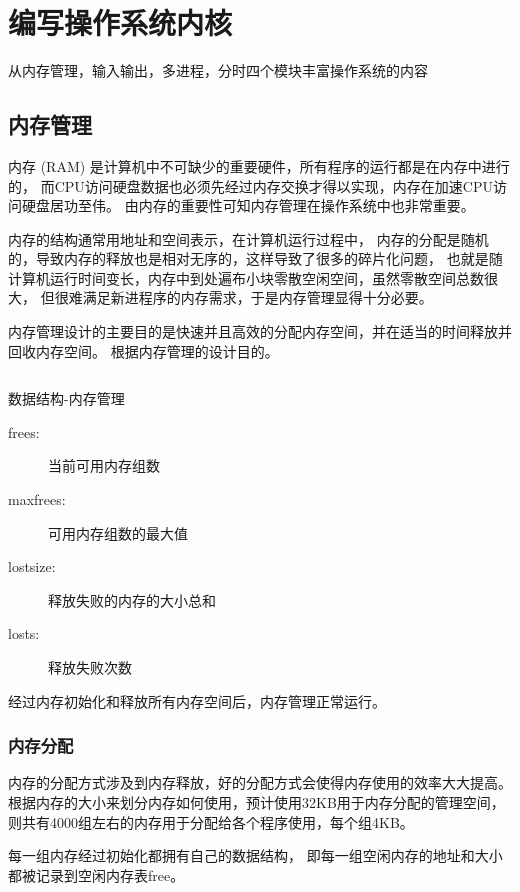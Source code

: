 \chapter{编写操作系统内核}

从内存管理，输入输出，多进程，分时四个模块丰富操作系统的内容

\section{内存管理}

内存 (RAM) 是计算机中不可缺少的重要硬件，所有程序的运行都是在内存中进行的，
而CPU访问硬盘数据也必须先经过内存交换才得以实现，内存在加速CPU访问硬盘居功至伟。
由内存的重要性可知内存管理在操作系统中也非常重要。	

内存的结构通常用地址和空间表示，在计算机运行过程中，
内存的分配是随机的，导致内存的释放也是相对无序的，这样导致了很多的碎片化问题，
也就是随计算机运行时间变长，内存中到处遍布小块零散空闲空间，虽然零散空间总数很大，
但很难满足新进程序的内存需求，于是内存管理显得十分必要。

内存管理设计的主要目的是快速并且高效的分配内存空间，并在适当的时间释放并回收内存空间。
根据内存管理的设计目的。

\begin{listing}[H]
  \inputminted[tabsize=2, firstline=137, lastline=143,
  linenos=true]{c}{../ZOS/src/kernel/bootpack.h}
  \caption{数据结构-内存管理}
  \label{lst:mem}
\end{listing}

\begin{description}
\item[frees:]当前可用内存组数
\item[maxfrees:]可用内存组数的最大值
\item[lostsize:]释放失败的内存的大小总和
\item[losts:]释放失败次数
\end{description}

经过内存初始化和释放所有内存空间后，内存管理正常运行。

\subsection{内存分配}

内存的分配方式涉及到内存释放，好的分配方式会使得内存使用的效率大大提高。
根据内存的大小来划分内存如何使用，预计使用32KB用于内存分配的管理空间，
则共有4000组左右的内存用于分配给各个程序使用，每个组4KB。

每一组内存经过初始化都拥有自己的数据结构，
即每一组空闲内存的地址和大小都被记录到空闲内存表free。

